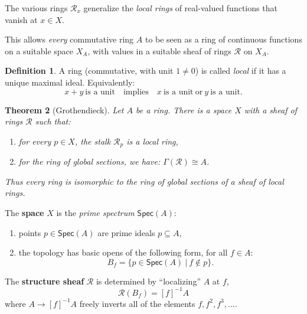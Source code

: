 \documentclass[11pt]{article}
\newtheorem{theorem}{Theorem}
\theoremstyle{remark}
\theoremstyle{definition}
\newtheorem{definition}[theorem]{Definition}
\newcommand{\myemph}[1]{\textbf{#1}}
\begin{document}
The various rings $\mathcal{R}_x$ generalize the \emph{local rings} of real-valued functions that vanish at $x\in X$.
\medskip

This allows \emph{every} commutative ring $A$ to be seen as a ring of continuous functions on a suitable space $X_A$, with values in a suitable sheaf of rings $\mathcal{R}$ on $X_A$.


\begin{definition} A  ring (commutative, with unit $1\neq 0$) is called \emph{local} if it has a unique maximal ideal.
Equivalently: $$x+y\ \text{is a unit}\quad\text{implies}\quad x\ \text{is a unit}\ \text{or}\ y\ \text{is a unit}.$$
\end{definition}
%
\begin{theorem}[Grothendieck]
Let $A$ be a ring.  There is a space $X$ with a sheaf of rings $\mathcal{R}$ such that:
\begin{enumerate}
\item for every $p\in X$, the stalk $\mathcal{R}_p$ is a local ring, 
\item for the ring of global sections, we have: $\Gamma(\mathcal{R}) \cong A$.
\end{enumerate}
Thus \emph{every ring is isomorphic to the ring of global sections of a sheaf of local rings}.
\end{theorem}


The \myemph{space} $X$ is the \emph{prime spectrum} $\mathsf{Spec}(A)$:
 \begin{enumerate}
\item points $p\in \mathsf{Spec}(A)$ are prime ideals $p\subseteq A$,
\item the topology has basic opens of the following form, for all $f\in A$:
 $$B_f = \{ p\in \mathsf{Spec}(A)\ |\ f\not\in p \}.$$
\end{enumerate}
The \myemph{structure sheaf} $\mathcal {R}$ is determined by ``localizing'' $A$ at $f$,
\[
\mathcal{R}(B_f) = [f]^{-1}A
\]
where $A \rightarrow [f]^{-1}A$ freely inverts all of the elements $f, f^2, f^3, \dots$.
\medskip
\end{document}
